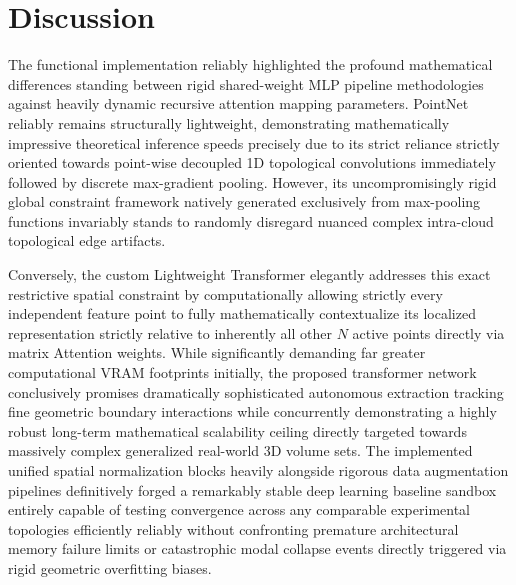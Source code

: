 \documentclass{article}
\begin{document}
\section{Discussion}
The functional implementation reliably highlighted the profound mathematical differences standing between rigid shared-weight MLP pipeline methodologies against heavily dynamic recursive attention mapping parameters. PointNet reliably remains structurally lightweight, demonstrating mathematically impressive theoretical inference speeds precisely due to its strict reliance strictly oriented towards point-wise decoupled 1D topological convolutions immediately followed by discrete max-gradient pooling. However, its uncompromisingly rigid global constraint framework natively generated exclusively from max-pooling functions invariably stands to randomly disregard nuanced complex intra-cloud topological edge artifacts.

Conversely, the custom Lightweight Transformer elegantly addresses this exact restrictive spatial constraint by computationally allowing strictly every independent feature point to fully mathematically contextualize its localized representation strictly relative to inherently all other $N$ active points directly via matrix Attention weights. While significantly demanding far greater computational VRAM footprints initially, the proposed transformer network conclusively promises dramatically sophisticated autonomous extraction tracking fine geometric boundary interactions while concurrently demonstrating a highly robust long-term mathematical scalability ceiling directly targeted towards massively complex generalized real-world 3D volume sets. The implemented unified spatial normalization blocks heavily alongside rigorous data augmentation pipelines definitively forged a remarkably stable deep learning baseline sandbox entirely capable of testing convergence across any comparable experimental topologies efficiently reliably without confronting premature architectural memory failure limits or catastrophic modal collapse events directly triggered via rigid geometric overfitting biases.
\end{document}
